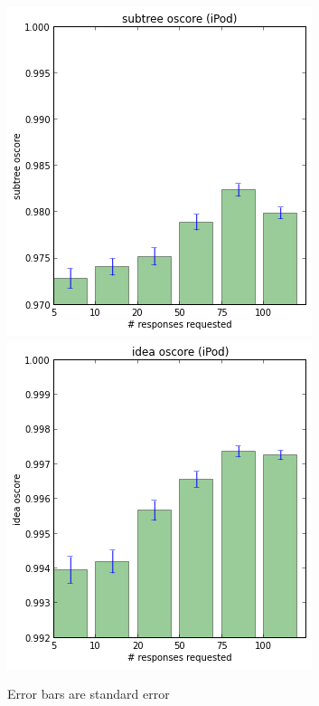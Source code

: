 \begin{figure}[h]
    \centering
    \includegraphics[width=0.9\columnwidth]{subtree_oscore}
    \includegraphics[width=0.9\columnwidth]{idea_oscore}
    \caption{Error bars are standard error}
\end{figure}

